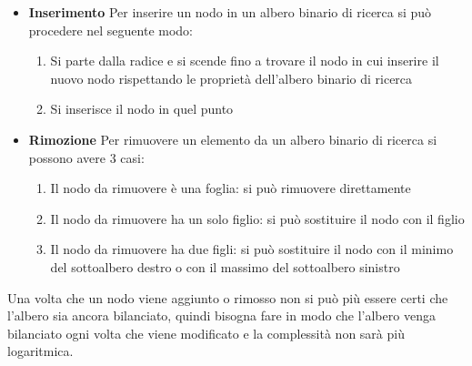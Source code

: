 \documentclass[a4paper]{article}
\begin{document}
\begin{itemize}
  \item \textbf{Inserimento}
    Per inserire un nodo in un albero binario di ricerca si può procedere nel seguente modo:
    \begin{enumerate}
      \item Si parte dalla radice e si scende fino a trovare il nodo in cui inserire il
        nuovo nodo rispettando le proprietà dell'albero binario di ricerca
      \item Si inserisce il nodo in quel punto
    \end{enumerate}

  \item \textbf{Rimozione}
    Per rimuovere un elemento da un albero binario di ricerca si possono avere 3 casi:
    \begin{enumerate}
      \item Il nodo da rimuovere è una foglia: si può rimuovere direttamente
      \item Il nodo da rimuovere ha un solo figlio: si può sostituire il nodo con il figlio
      \item Il nodo da rimuovere ha due figli: si può sostituire il nodo con il minimo
        del sottoalbero destro o con il massimo del sottoalbero sinistro
    \end{enumerate}
    
\end{itemize}
Una volta che un nodo viene aggiunto o rimosso non si può più essere certi che 
l'albero sia ancora bilanciato, quindi bisogna fare in modo che l'albero venga
bilanciato ogni volta che viene modificato e la complessità non sarà più logaritmica.
\end{document}

